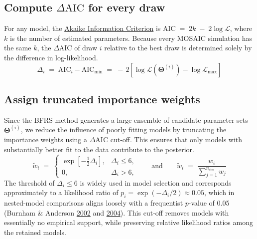 \documentclass[
]{book}
\begin{document}
\subsection{\texorpdfstring{Compute \(\Delta \text{AIC}\) for every draw}{Compute \textbackslash Delta \textbackslash text\{AIC\} for every draw}}\label{compute-delta-textaic-for-every-draw}

For any model, the \href{https://en.wikipedia.org/wiki/Akaike_information_criterion}{Akaike Information Criterion} is \(\text{AIC} \;=\; 2k \;-\; 2\log\mathcal{L}\), where \(k\) is the number of estimated parameters. Because every MOSAIC simulation has the same \(k\), the \(\Delta \text{AIC}\) of draw \(i\) relative to the best draw is determined solely by the difference in log-likelihood.
\begin{equation}
\Delta_i
\;=\;
\text{AIC}_i - \text{AIC}_{\text{min}}
\;=\;
-\,2\!\left[\log\mathcal{L}(\boldsymbol{\Theta}^{(i)}) -
\log\mathcal{L}_{\max}\right]
\label{eq:aic-delta}
\end{equation}

\subsection{Assign truncated importance weights}\label{assign-truncated-importance-weights}

Since the BFRS method generates a large ensemble of candidate parameter sets \(\boldsymbol{\Theta}^{(i)}\), we reduce the influence of poorly fitting models by truncating the importance weights using a \(\Delta \text{AIC}\) cut-off. This ensures that only models with substantially better fit to the data contribute to the posterior.
\begin{equation}
\tilde{w}_i \;=\;
\begin{cases}
\exp\!\left[-\tfrac12 \Delta_i\right], & \Delta_i \le 6,\\[6pt]
0, & \Delta_i > 6,
\end{cases}
\qquad \text{and} \qquad
\tilde{w}_i \;=\;
\dfrac{w_i}{\displaystyle\sum_{j=1}^{n_{\text{sim}}} w_j}
\label{eq:aic-weights}
\end{equation}
The threshold of \(\Delta_i \le 6\) is widely used in model selection and corresponds approximately to a likelihood ratio of \(p_i = \exp(-\Delta_i/2) \approx 0.05\), which in nested-model comparisons aligns loosely with a frequentist \(p\)-value of 0.05 (Burnham \& Anderson \href{https://doi.org/10.1007/b97636}{2002} and \href{https://journals.sagepub.com/doi/abs/10.1177/0049124104268644}{2004}). This cut-off removes models with essentially no empirical support, while preserving relative likelihood ratios among the retained models.
\end{document}
